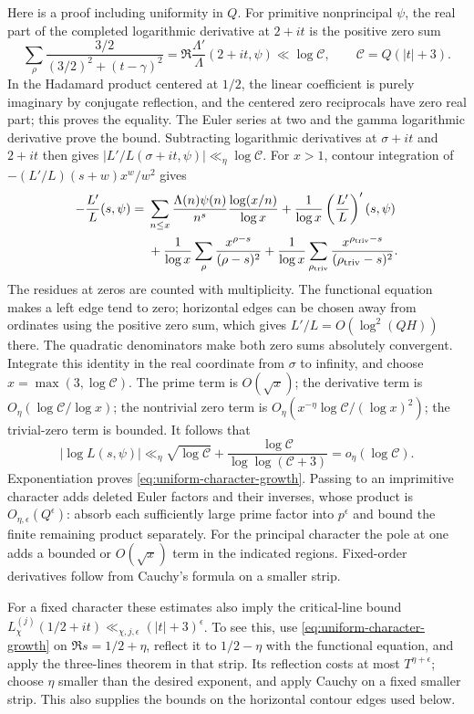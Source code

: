 Here is a proof including uniformity in $Q$. For primitive nonprincipal
$\psi$, the real part of the completed logarithmic derivative at $2+it$
is the positive zero sum
\[
 \sum_\rho\frac{3/2}{(3/2)^2+(t-\gamma)^2}
     =\Re\frac{\Lambda'}\Lambda(2+it,\psi)
     \ll\log\mathcal C,\qquad \mathcal C=Q(|t|+3).
\]
In the Hadamard product centered at $1/2$, the linear coefficient is
purely imaginary by conjugate reflection, and the centered zero
reciprocals have zero real part; this proves the equality. The Euler
series at two and the gamma logarithmic derivative prove the bound.
Subtracting logarithmic derivatives at $\sigma+it$ and $2+it$ then gives
$|L'/L(\sigma+it,\psi)|\ll_\eta\log\mathcal C$.
For $x>1$, contour integration of $-(L'/L)(s+w)x^w/w^2$ gives
\begin{align*}
 -\frac{L'}L(s,\psi)={}&
 \sum_{n\le x}\frac{\Lambda(n)\psi(n)}{n^s}
                     \frac{\log(x/n)}{\log x}
 +\frac1{\log x}\left(\frac{L'}L\right)'(s,\psi)\\
 &+\frac1{\log x}\sum_\rho\frac{x^{\rho-s}}{(\rho-s)^2}
 +\frac1{\log x}\sum_{\rho_{\rm triv}}
                       \frac{x^{\rho_{\rm triv}-s}}{(\rho_{\rm triv}-s)^2}.
\end{align*}
The residues at zeros are counted with multiplicity. The functional
equation makes a left edge tend to zero; horizontal edges can be
chosen away from ordinates using the positive zero sum, which gives
$L'/L=O(\log^2(QH))$ there. The quadratic denominators make both zero
sums absolutely convergent.
Integrate this identity in the real coordinate from $\sigma$ to infinity,
and choose $x=\max(3,\log\mathcal C)$. The prime term is $O(\sqrt x)$;
the derivative term is $O_\eta(\log\mathcal C/\log x)$; the nontrivial
zero term is
$O_\eta(x^{-\eta}\log\mathcal C/(\log x)^2)$; the trivial-zero term
is bounded. It follows that
\[
 |\log L(s,\psi)|\ll_\eta\sqrt{\log\mathcal C}
       +\frac{\log\mathcal C}{\log\log(\mathcal C+3)}
       =o_\eta(\log\mathcal C).
\]
Exponentiation proves \eqref{eq:uniform-character-growth}. Passing to
an imprimitive character adds deleted Euler factors and their inverses,
whose product is $O_{\eta,\epsilon}(Q^\epsilon)$: absorb each sufficiently
large prime factor into $p^\epsilon$ and bound the finite remaining
product separately. For the principal character the pole at one adds
a bounded or $O(\sqrt x)$ term in the indicated regions. Fixed-order
derivatives follow from Cauchy's formula on a smaller strip.

For a fixed character these estimates also imply the critical-line
bound $L_\chi^{(j)}(1/2+it)\ll_{\chi,j,\epsilon}(|t|+3)^\epsilon$.
To see this, use \eqref{eq:uniform-character-growth} on
$\Re s=1/2+\eta$, reflect it to $1/2-\eta$ with the functional
equation, and apply the three-lines theorem in that strip. Its
reflection costs at most $T^{\eta+\epsilon}$; choose $\eta$ smaller
than the desired exponent, and apply Cauchy on a fixed smaller
strip. This also supplies the bounds on the horizontal contour edges
used below.

